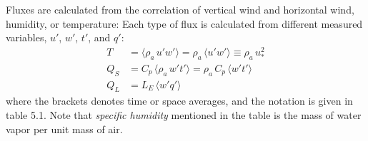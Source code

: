 Fluxes are calculated from the correlation of vertical wind and
horizontal wind, humidity, or temperature: Each type of flux is
calculated from different measured variables, $u'$, $w'$, $t'$, and
$q'$:
\begin{subequations}
\begin{align}
T &= \langle \rho_a \,{u'w'}\rangle = \rho_a \, \langle {u'w'}\rangle \equiv \rho_a \,u_*^2\\
Q_S &= C_p\,\langle\rho_a\,{w't'}\rangle = \rho_a \, {C_p} \, \langle{w't'}\rangle \\ 
Q_L &= L_E \, \langle{w'q'}\rangle
\end{align}
\end{subequations}
where the brackets denotes time or space averages, and the notation is
given in table 5.1. Note that \textit{specific
  humidity} mentioned in the table is
the mass of water vapor per unit mass of air.

